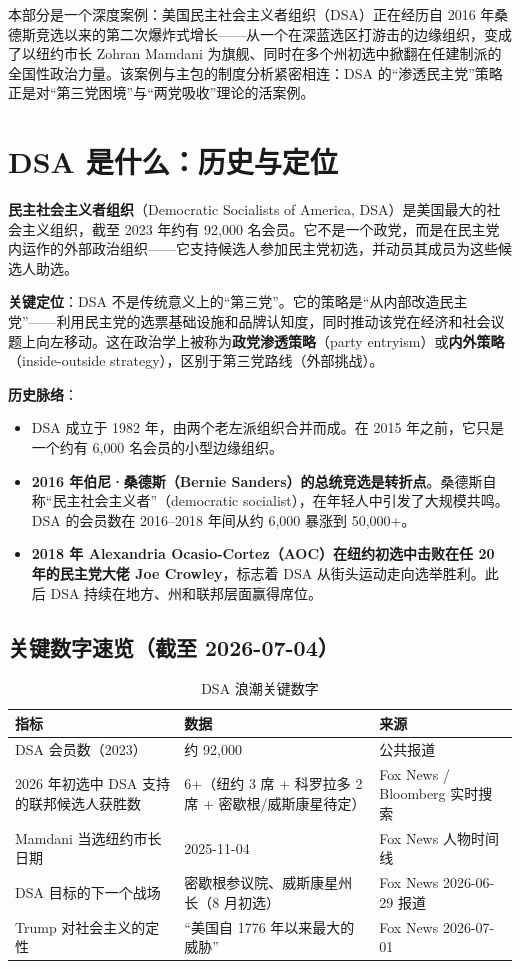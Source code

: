 \documentclass[12pt,a4paper]{ctexart}
\begin{document}
本部分是一个深度案例：美国民主社会主义者组织（DSA）正在经历自 2016 年桑德斯竞选以来的第二次爆炸式增长——从一个在深蓝选区打游击的边缘组织，变成了以纽约市长 Zohran Mamdani 为旗舰、同时在多个州初选中掀翻在任建制派的全国性政治力量。该案例与主包的制度分析紧密相连：DSA 的``渗透民主党''策略正是对``第三党困境''与``两党吸收''理论的活案例。

\section{DSA 是什么：历史与定位}

\textbf{民主社会主义者组织}（Democratic Socialists of America, DSA）是美国最大的社会主义组织，截至 2023 年约有 92{,}000 名会员。它不是一个政党，而是在民主党内运作的外部政治组织——它支持候选人参加民主党初选，并动员其成员为这些候选人助选。

\textbf{关键定位}：DSA 不是传统意义上的``第三党''。它的策略是``从内部改造民主党''——利用民主党的选票基础设施和品牌认知度，同时推动该党在经济和社会议题上向左移动。这在政治学上被称为\textbf{政党渗透策略}（party entryism）或\textbf{内外策略}（inside-outside strategy），区别于第三党路线（外部挑战）。

\textbf{历史脉络}：

\begin{itemize}
  \item DSA 成立于 1982 年，由两个老左派组织合并而成。在 2015 年之前，它只是一个约有 6{,}000 名会员的小型边缘组织。
  \item \textbf{2016 年伯尼·桑德斯（Bernie Sanders）的总统竞选是转折点}。桑德斯自称``民主社会主义者''（democratic socialist），在年轻人中引发了大规模共鸣。DSA 的会员数在 2016--2018 年间从约 6{,}000 暴涨到 50{,}000+。
  \item \textbf{2018 年 Alexandria Ocasio-Cortez（AOC）在纽约初选中击败在任 20 年的民主党大佬 Joe Crowley}，标志着 DSA 从街头运动走向选举胜利。此后 DSA 持续在地方、州和联邦层面赢得席位。
\end{itemize}

\subsection{关键数字速览（截至 2026-07-04）}

\begin{table}[h]
\centering
\caption{DSA 浪潮关键数字}
\begin{tabular}{@{}lp{7.2cm}p{5.6cm}@{}}
\toprule
\textbf{指标} & \textbf{数据} & \textbf{来源} \\
\midrule
DSA 会员数（2023） & 约 92{,}000 & 公共报道 \\
2026 年初选中 DSA 支持的联邦候选人获胜数 & 6+（纽约 3 席 + 科罗拉多 2 席 + 密歇根/威斯康星待定） & Fox News / Bloomberg 实时搜索 \\
Mamdani 当选纽约市长日期 & 2025-11-04 & Fox News 人物时间线 \\
DSA 目标的下一个战场 & 密歇根参议院、威斯康星州长（8 月初选） & Fox News 2026-06-29 报道 \\
Trump 对社会主义的定性 & ``美国自 1776 年以来最大的威胁'' & Fox News 2026-07-01 \\
\bottomrule
\end{tabular}
\end{table}
\end{document}
